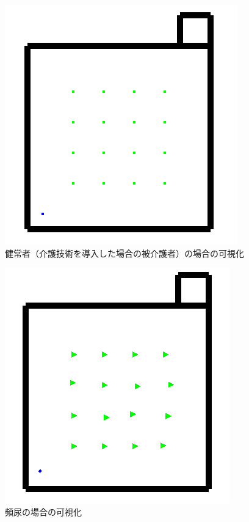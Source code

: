 \begin{figure}[htb]
\begin{center}
 \includegraphics[scale=0.6]{figures/elderly_v1.png}
 \caption[健常者（介護技術を導入した場合の被介護者）の場合の可視化]{健常者（介護技術を導入した場合の被介護者）の場合の可視化 \label{elderly_v1}}
\end{center}
\end{figure}

\begin{figure}[htb]
\begin{center}
 \includegraphics[scale=0.6]{figures/elderly_v2.png}
 \caption[頻尿の場合の可視化]{頻尿の場合の可視化 \label{elderly_v2}}
\end{center}
\end{figure}

